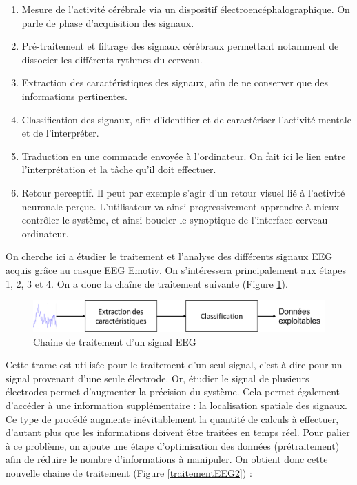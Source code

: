 \begin{enumerate}
	\item Mesure de l'activité cérébrale via un dispositif électroencéphalographique. On parle de phase d'acquisition des signaux. 
	\smallbreak
	\item Pré-traitement et filtrage des signaux cérébraux permettant notamment de dissocier les différents rythmes du cerveau. 
	\smallbreak
	\item Extraction des caractéristiques des signaux, afin de ne conserver que des informations pertinentes.
	\smallbreak
	\item Classification des signaux, afin d'identifier et de caractériser l'activité mentale et de l'interpréter. 
	\smallbreak
	\item Traduction en une commande envoyée à l'ordinateur. On fait ici le lien entre l'interprétation et la tâche qu'il doit effectuer.
	\smallbreak
	\item Retour perceptif. Il peut par exemple s'agir d'un retour visuel lié à l'activité neuronale perçue. L'utilisateur va ainsi progressivement apprendre à mieux contrôler le système, et ainsi boucler le synoptique de l'interface cerveau-ordinateur. 
\end{enumerate}

\smallbreak
On cherche ici a étudier le traitement et l'analyse des différents signaux EEG acquis grâce au casque EEG Emotiv. On s'intéressera principalement aux étapes 1, 2, 3 et 4. On a donc la chaîne de traitement suivante (Figure \ref{traitementEEG1}). 

\begin{figure}[h]
	\centering\includegraphics[width=16cm]{images/traitementEEG1.png}
	\caption{Chaine de traitement d'un signal EEG}
	\label{traitementEEG1}
\end{figure}

Cette trame est utilisée pour le traitement d'un seul signal, c'est-à-dire pour un signal provenant d'une seule électrode. Or, étudier le signal de plusieurs électrodes permet d'augmenter la précision du système. Cela permet également d'accéder à une information supplémentaire : la localisation spatiale des signaux. Ce type de procédé augmente inévitablement la quantité de calculs à effectuer, d'autant plus que les informations doivent être traitées en temps réel. Pour palier à ce problème, on ajoute une étape d'optimisation des données (prétraitement) afin de réduire le nombre d'informations à manipuler. On obtient donc cette nouvelle chaine de traitement (Figure \ref{traitementEEG2}) : 

